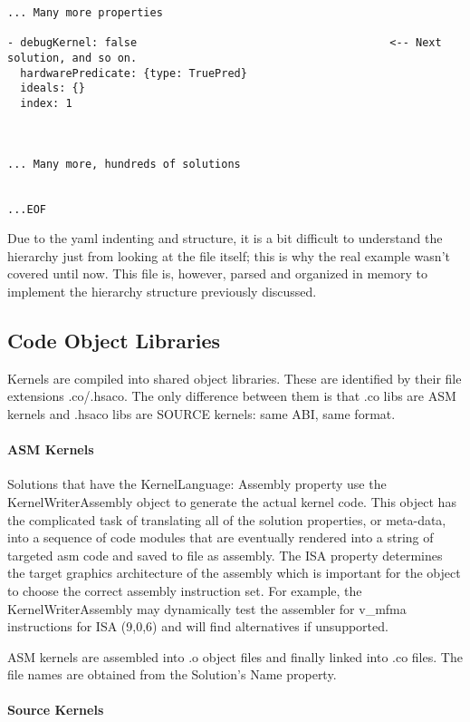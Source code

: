 \documentclass[]{article}
\begin{document}
\begin{verbatim}
... Many more properties

- debugKernel: false                                       <-- Next solution, and so on. 
  hardwarePredicate: {type: TruePred}
  ideals: {}
  index: 1



... Many more, hundreds of solutions


...EOF
\end{verbatim} 

\noindent
Due to the yaml indenting and structure, it is a bit difficult to understand the hierarchy just from looking at the file itself; this is why the real example wasn't covered until now. This file is, however, parsed and organized in memory to implement the hierarchy structure previously discussed.

\subsection{Code Object Libraries}

Kernels are compiled into shared object libraries. These are identified by their file extensions .co/.hsaco. The only difference between them is that .co libs are ASM kernels and .hsaco libs are SOURCE kernels: same ABI, same format.

\paragraph{ASM Kernels}

Solutions that have the KernelLanguage: Assembly property use the KernelWriterAssembly object to generate the actual kernel code. This object has the complicated task of translating all of the solution properties, or meta-data, into a sequence of code modules that are eventually rendered into a string of targeted asm code and saved to file as assembly. The ISA property determines the target graphics architecture of the assembly which is important for the object to choose the correct assembly instruction set. For example, the KernelWriterAssembly may dynamically test the assembler for v\_mfma instructions for ISA (9,0,6) and will find alternatives if unsupported.

ASM kernels are assembled into .o object files and finally linked into .co files. The file names are obtained from the Solution's Name property.

\paragraph{Source Kernels}
\end{document}
